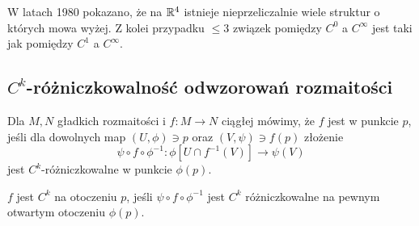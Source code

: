 W latach 1980 pokazano, że na $\mathbb{R}^4$ istnieje nieprzeliczalnie wiele struktur o których mowa wyżej. Z kolei przypadku $\leq 3$ związek pomiędzy $C^0$ a $C^\infty$ jest taki jak pomiędzy $C^1$ a $C^\infty$.

\subsection{$C^k$-różniczkowalność odwzorowań rozmaitości}

\begin{definition}\label{definicja:1.12}
Dla $M, N$ gładkich rozmaitości i $f:M\to N$ ciągłej mówimy, że $f$ jest  w punkcie $p$, jeśli dla dowolnych map $(U,\phi)\ni p$ oraz $(V,\psi)\ni f(p)$ złożenie
$$\psi\circ f\circ\phi^{-1}:\phi[U\cap f^{-1}(V)]\to \psi(V)$$
jest $C^k$-różniczkowalne w punkcie $\phi(p)$.

$f$ jest $C^k$ na otoczeniu $p$, jeśli $\psi\circ f\circ\phi^{-1}$ jest $C^k$ różniczkowalne na pewnym otwartym otoczeniu $\phi(p)$.
\end{definition}

